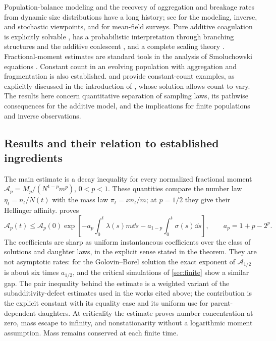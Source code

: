 Population-balance modeling and the recovery of aggregation and breakage
rates from dynamic size distributions have a long history; see
\citet[Chapters 2, 6, and 7]{Ramkrishna2000} for the modeling, inverse,
and stochastic viewpoints, and \citet{Aldous1999,Wattis2006} for
mean-field surveys. Pure additive coagulation is explicitly solvable
\citep{Golovin1963}, has a probabilistic interpretation through
branching structures and the additive coalescent
\citep{AldousPitman1998,DeaconuTanre2000,Bertoin2002}, and a complete
scaling theory \citep{MenonPego2008}. Fractional-moment estimates are
standard tools in the analysis of Smoluchowski equations
\citep{EscobedoMischlerPerthame2002,FournierLaurencot2005,FournierLaurencot2006,EscobedoMischlerRodriguezRicard2005}. Constant count in an evolving population
with aggregation and fragmentation is also established.
\citet{PatilAndrews1998} and \citet{Lage2002} provide constant-count
examples, as explicitly discussed in the introduction of
\citet{McCoyMadras2003}, whose solution allows count to vary.
The results here concern quantitative separation of sampling laws,
its pathwise consequences for the additive model, and the implications
for finite populations and inverse observations.

\subsection{Results and their relation to established ingredients}

The main estimate is a decay inequality for every normalized
fractional moment
$\mathcal A_p=M_p/(N^{1-p}m^p)$, $0<p<1$.
These quantities compare the number law $\eta_t=n_t/N(t)$ with the mass
law $\pi_t=xn_t/m$; at $p=1/2$ they give their Hellinger affinity.
 proves
\[
 \mathcal A_p(t)\leq\mathcal A_p(0)
 \exp\!\left[-a_p\int_0^t\lambda(s)m\dd s
             -a_{1-p}\int_0^t\sigma(s)\dd s\right],
 \qquad a_p=1+p-2^p.
\]
The coefficients are sharp as uniform instantaneous coefficients over
the class of solutions and daughter laws, in the explicit sense stated in
the theorem. They are not asymptotic rates: for the Golovin--Borel
solution the exact exponent of $\mathcal A_{1/2}$ is about six times
$a_{1/2}$, and the critical simulations of \cref{sec:finite} show a
similar gap. The pair inequality behind the estimate is a weighted
variant of the subadditivity-defect estimates used in the works cited
above; the contribution is the explicit constant with its equality case
and its uniform use for parent-dependent daughters. At criticality the estimate
proves number concentration at zero, mass escape to infinity, and
nonstationarity without a logarithmic moment assumption. Mass remains
conserved at each finite time.

